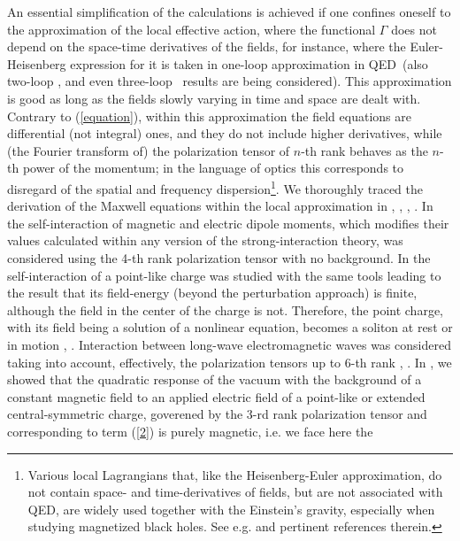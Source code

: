 \documentclass[12pt]{article}
\begin{document}
An essential simplification of the calculations is achieved if one confines
oneself to the approximation of the local effective action, where the
functional $\Gamma $ does not depend on the space-time derivatives of the
fields, for instance, where the Euler-Heisenberg expression for it is taken
in one-loop \cite{Heisenberg} approximation in QED\ (also two-loop \cite%
{ritus}, \cite{Karb} and even three-loop \cite{schubert}\ results are being
considered). This approximation is good as long as the fields slowly varying
in time and space are dealt with. Contrary to (\ref{equation}), within this
approximation the field equations are differential (not integral) ones, and
they do not include higher derivatives, while (the Fourier transform of) the
polarization tensor of $n$-th rank behaves as the $n$-th power of the
momentum; in the language of optics this corresponds to disregard of the
spatial and frequency dispersion\footnote{%
Various local Lagrangians that, like the Heisenberg-Euler approximation, do
not contain space- and time-derivatives of fields, but are not associated
with QED, are widely used together with the Einstein's gravity, especially
when studying magnetized black holes. See e.g. \cite{kruglov} and pertinent
references therein.}. We thoroughly traced the derivation of the Maxwell
equations within the local approximation in \cite{ShaGit2012}, \cite%
{CosGitSha2013}, \cite{AdoGitSha2013}, \cite{AdoGitShaShi2016}. In \cite%
{CosGitSha2013} the self-interaction of magnetic and electric dipole
moments, which modifies their values calculated within any version of the
strong-interaction theory, was considered using the 4-th rank polarization
tensor with no background. In \cite{CosGitSha2013a} the self-interaction of
a point-like charge was studied with the same tools leading to the result
that its field-energy (beyond the perturbation approach) is finite, although
the field in the center of the charge is not. Therefore, the point charge,
with its field being a solution of a nonlinear equation, becomes a soliton
at rest or in motion \cite{Shishmarev}, \cite{Ependiev}. Interaction between
long-wave electromagnetic waves was considered taking into account,
effectively, the polarization tensors up to 6-th rank \cite{King}, \cite{Di
Piazza}. In \cite{AdoGitSha2013}, \cite{AdoGitSha2014} we showed that the
quadratic response of the vacuum with the background of a constant magnetic
field to an applied electric field of a point-like or extended
central-symmetric charge, goverened by the 3-rd rank polarization tensor and
corresponding to term (\ref{2}) is purely magnetic, i.e. we face here the
\end{document}
